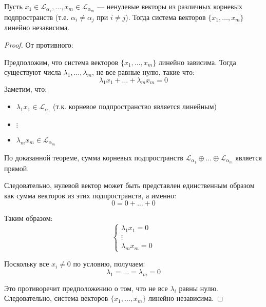 \vspace{0.3cm}

\begin{shcor}
    \begin{corollary}
        \leavevmode \nl 
        
        Пусть $x_1 \in \mathcal{L}_{\alpha_1}, \ldots, x_m \in \mathcal{L}_{\alpha_m}$ — ненулевые векторы из различных корневых \\подпространств (т.е. $\alpha_i \neq \alpha_j$ при $i \neq j$). Тогда система векторов $\{x_1, \ldots, x_m\}$ линейно независима.
    \end{corollary}
\end{shcor}

\begin{proof}
    От противного:
    
    Предположим, что система векторов $\{x_1, \ldots, x_m\}$ линейно зависима. Тогда \\существуют числа $\lambda_1, \ldots, \lambda_m$, не все равные нулю, такие что:
    \[
        \lambda_1 x_1 + \ldots + \lambda_m x_m = 0
    \]
    \clearpage
    Заметим, что:
    \begin{itemize}
        \item $\lambda_1 x_1 \in \mathcal{L}_{\alpha_1}$ (т.к. корневое подпространство является линейным)
        \item $\vdots$
        \item $\lambda_m x_m \in \mathcal{L}_{\alpha_m}$
    \end{itemize}
    
    По доказанной теореме, сумма корневых подпространств 
    $\mathcal{L}_{\alpha_1} \oplus \ldots \oplus \mathcal{L}_{\alpha_m}$ является прямой. 
    
    Следовательно, нулевой вектор может быть представлен единственным образом как сумма векторов из этих подпространств, а именно:
    \[
        0 = 0 + \ldots + 0
    \]
    
    Таким образом:
    \[
        \begin{cases}
            \lambda_1 x_1 = 0 \\
            \vdots \\
            \lambda_m x_m = 0
        \end{cases}
    \]
    
    Поскольку все $x_i \neq 0$ по условию, получаем:
    \[
        \lambda_1 = \ldots = \lambda_m = 0
    \]
    
    Это противоречит предположению о том, что не все $\lambda_i$ равны нулю. 
    \\Следовательно, система векторов $\{x_1, \ldots, x_m\}$ линейно независима.
\end{proof}

